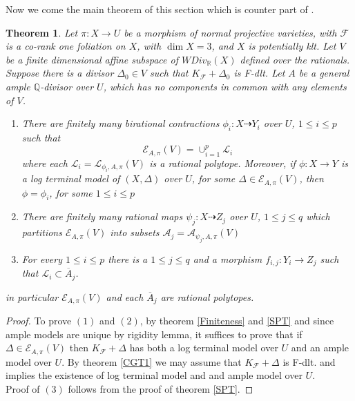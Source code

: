 \documentclass[12pt]{amsart}%
\theoremstyle{plain}
\newtheorem{theorem}{Theorem}[section]
\theoremstyle{remark}
\theoremstyle{definition}
\newcommand{\<}{\leq}
\newcommand{\mbQ}{\mathbb{Q}}
\newcommand{\mbR}{\mathbb{R}}
\def\dim{\operatorname{dim}}
\theoremstyle{definition}
\theoremstyle{definition}
\numberwithin{equation}{section}
\theoremstyle{remark}
\begin{document}
Now we come the main theorem of this section which is counter part of \cite[Corollary $1.1.5$]{BCHM}.
\begin{theorem}\label{LGLCM}
    Let $\pi:X\rightarrow U$ be a morphism of normal projective varieties, with $\mathcal{F}$ is a co-rank one foliation on $X$, with $\dim X=3$, and $X$ is potentially klt. Let $V$ be a finite dimensional affine subspace of $WDiv_{\mbR}(X)$ defined over the rationals. Suppose there is a divisor $\Delta_0\in V$ such that $K_{\mathcal{F}}+\Delta_0$ is F-dlt. Let $A$ be a general ample $\mbQ$-divisor over $U$, which has no components in common with any elements of $V$.
    \begin{enumerate}
        \item There are finitely many birational contractions $\phi_i:X\dashrightarrow Y_i$ over $U$,
        $1\leqslant i\leqslant p$ such that \[
        \mathcal{E}_{A,\pi}(V)=\cup_{i=1}^{p} \mathcal{L}_i
        \]
        where each $\mathcal{L}_i=\mathcal{L}_{\phi_i,A,\pi}(V)$ is a rational polytope. Moreover, if $\phi:X\rightarrow Y$ is a log terminal model of $(X,\Delta)$ over $U$, for some $\Delta\in \mathcal{E}_{A,\pi}(V)$, then $\phi=\phi_i$, for some $1\leqslant i\leqslant p$
        \item There are finitely many rational maps $\psi_j:X\dashrightarrow Z_j$ over $U$, $1\leqslant j\leqslant q$ which partitions $\mathcal{E}_{A,\pi}(V)$ into subsets $\mathcal{A}_j=\mathcal{A}_{\psi_j,A,\pi}(V)$
        \item For every $1\leqslant i\leqslant p$ there is a $1\leqslant j\leqslant q$ and a morphism $f_{i,j}:Y_i\rightarrow Z_j$ such that $\mathcal{L}_i\subset \overline{A}_j$.
    \end{enumerate}
    in particular $\mathcal{E}_{A,\pi}(V)$ and each $\overline{A}_j$ are rational polytopes.
\end{theorem}

\begin{proof}
  To prove $(1)$ and $(2)$, by theorem \ref{Finiteness} and \ref{SPT} and since ample models are unique by rigidity lemma, it suffices to prove that if $\Delta\in \mathcal{E}_{A,\pi}(V)$ then $K_{\mathcal{F}}+\Delta$ has both a log terminal model over $U$ and an ample model over $U$. By theorem \ref{CGT1} we may assume that $K_{\mathcal{F}}+\Delta$ is F-dlt. \cite{CS21} and \cite{SS19} implies the existence of log terminal model and and ample model over $U$.\\
  Proof of $(3)$ follows from the proof of theorem \ref{SPT}. 




    
    \end{proof}
\end{document}
